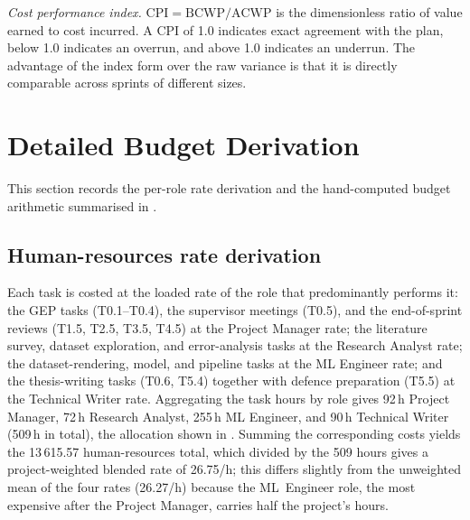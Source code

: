 \textit{Cost performance index.}
$\mathrm{CPI} = \mathrm{BCWP} / \mathrm{ACWP}$ is the
dimensionless ratio of value earned to cost incurred.
A CPI of 1.0 indicates exact agreement with the plan, below 1.0
indicates an overrun, and above 1.0 indicates an underrun.
The advantage of the index form over the raw variance is that it
is directly comparable across sprints of different sizes.

\section{Detailed Budget Derivation}
\label{app:budget-detail}

This section records the per-role rate derivation and the
hand-computed budget arithmetic summarised in
.

\subsection*{Human-resources rate derivation}

Each task is costed at the loaded rate of the role that
predominantly performs it: the GEP tasks (T0.1--T0.4), the supervisor
meetings (T0.5), and the end-of-sprint reviews (T1.5, T2.5, T3.5,
T4.5) at the Project Manager rate; the literature survey, dataset
exploration, and error-analysis tasks at the Research Analyst rate;
the dataset-rendering, model, and pipeline tasks at the ML Engineer
rate; and the thesis-writing tasks (T0.6, T5.4) together with defence
preparation (T5.5) at the Technical Writer rate.
Aggregating the task hours by role gives \num{92}\,h Project Manager,
\num{72}\,h Research Analyst, \num{255}\,h ML Engineer, and
\num{90}\,h Technical Writer (\num{509}\,h in total), the allocation
shown in .
Summing the corresponding costs yields the \EUR{}13\,615.57
human-resources total, which divided by the 509 hours gives a
project-weighted blended rate of \EUR{}26.75/h; this differs slightly
from the unweighted mean of the four rates (\EUR{}26.27/h) because the
ML~Engineer role, the most expensive after the Project Manager,
carries half the project's hours.

